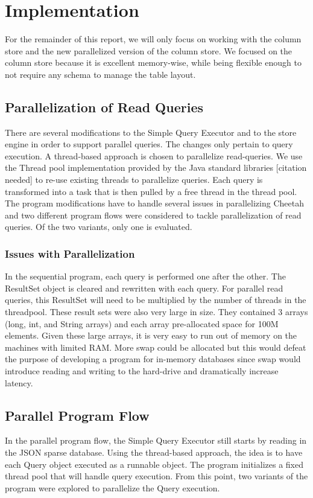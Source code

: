 \documentclass[11pt,journal,compsoc]{IEEEtran}
\begin{document}
\section{Implementation}

For the remainder of this report, we will only focus on working with the column store and the new parallelized version of the column store. We focused on the column store because it is excellent memory-wise, while being flexible enough to not require any schema to manage the table layout. 


\subsection{Parallelization of Read Queries}
There are several modifications to the Simple Query Executor and to the store engine in order to support parallel queries. The changes only pertain to query execution. A thread-based approach is chosen to parallelize read-queries. We use the Thread pool implementation provided by the Java standard libraries [citation needed] to re-use existing threads to parallelize queries. Each query is transformed into a task that is then pulled by a free thread in the thread pool. The program modifications have to handle several issues in parallelizing Cheetah and two different program flows were considered to tackle parallelization of read queries. Of the two variants, only one is evaluated.

\subsubsection{Issues with Parallelization}
In the sequential program, each query is performed one after the other. The ResultSet object is cleared and rewritten with each query. For parallel read queries, this ResultSet will need to be multiplied by the number of threads in the threadpool. These result sets were also very large in size. They contained 3 arrays (long, int, and String arrays) and each array pre-allocated space for 100M elements. Given these large arrays, it is very easy to run out of memory on the machines with limited RAM. More swap could be allocated but this would defeat the purpose of developing a program for in-memory databases since swap would introduce reading and writing to the hard-drive and dramatically increase latency.

\subsection{Parallel Program Flow}
In the parallel program flow, the Simple Query Executor still starts by reading in the JSON sparse database. Using the thread-based approach, the idea is to have each Query object executed as a runnable object. The program initializes a fixed thread pool that will handle query execution. From this point, two variants of the program were explored to parallelize the Query execution.
\end{document}

